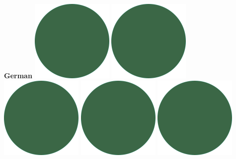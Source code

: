 \documentclass[]{commands}
\begin{document}
\begin{aside}
\textbf{German}\hfill
\includegraphics[scale=0.11]{img/IPSGreenDots.png}
\includegraphics[scale=0.11]{img/IPSGreenDots.png}
\includegraphics[scale=0.11]{img/IPSGreenDots.png}
\includegraphics[scale=0.11]{img/IPSGreenDots.png}
\includegraphics[scale=0.11]{img/IPSGreenDots.png}


\end{aside}
\end{document}
